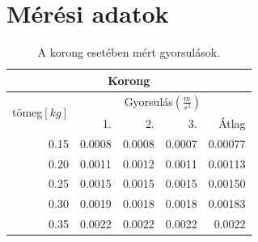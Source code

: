 \documentclass[10pt,pdftex]{report}
\begin{document}
\section*{Mérési adatok}
\begin{table}[H]
    \centering
    \begin{tabular}{|r|r|r|r|r|}
        \hline
        \multicolumn{5}{|c|}{Korong}\\
        \hline
        \multirow[c]{2}{*}{tömeg$[kg]$} & \multicolumn{4}{|c|}{Gyorsulás$(\frac{m}{s^2})$} \\
        \cline{2-5}
        & 1. & 2. & 3. & Átlag\\
        \hline
        0.15 & 0.0008 & 0.0008 & 0.0007 & 0.00077\\
        \hline
        0.20 & 0.0011 & 0.0012 & 0.0011 & 0.00113 \\
        \hline
        0.25 & 0.0015 & 0.0015 & 0.0015 & 0.00150 \\
        \hline
        0.30 & 0.0019 & 0.0018 & 0.0018 & 0.00183 \\
        \hline
        0.35 & 0.0022 & 0.0022 & 0.0022 & 0.0022 \\ 
        \hline
    \end{tabular}
    \caption{A korong esetében mért gyorsulások.}
\end{table}
\end{document}
